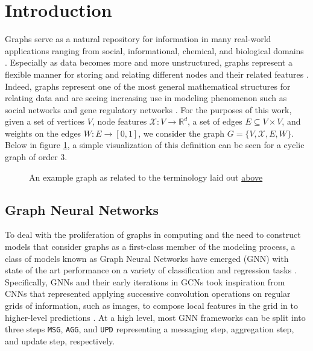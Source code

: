 \section{Introduction}
\label{sec:intro}
Graphs serve as a natural repository for information in many real-world applications ranging from social, informational, chemical, and biological domains \cite{cho_friendship_2011}. Especially as data becomes more and more unstructured, graphs represent a flexible manner for storing and relating different nodes and their related features \cite{washio_state_2003}. Indeed, graphs represent one of the most general mathematical structures for relating data and are seeing increasing use in modeling phenomenon such as social networks and gene regulatory networks \cite{washio_state_2003,petralia_new_2016}. For the purposes of this work, given a set of vertices $V$, node features $\mathcal{X} : V \rightarrow \mathbb{R}^{d}$, a set of edges $E \subseteq V \times V$, and weights on the edges $W : E \rightarrow [0,1]$, we consider the graph $G = \{V, \mathcal{X}, E, W\}$. Below in figure \ref{fig:graph_ex}, a simple visualization of this definition can be seen for a cyclic graph of order 3.
\begin{figure}[b]
  \centering
  
  \caption{An example graph as related to the terminology laid out \hyperref[sec:intro]{above}}
  \label{fig:graph_ex}
\end{figure}

\subsection{Graph Neural Networks}
To deal with the proliferation of graphs in computing and the need to construct models that consider graphs as a first-class member of the modeling process, a class of models known as Graph Neural Networks have emerged (GNN) with state of the art performance on a variety of classification and regression tasks \cite{ying_gnnexplainer_2019}. Specifically, GNNs and their early iterations in GCNs took inspiration from CNNs that represented applying successive convolution operations on regular grids of information, such as images, to compose local features in the grid in to higher-level predictions \cite{defferrard_convolutional_2017}. At a high level, most GNN frameworks can be split into three steps \verb|MSG|, \verb|AGG|, and \verb|UPD| representing a messaging step, aggregation step, and update step, respectively.

